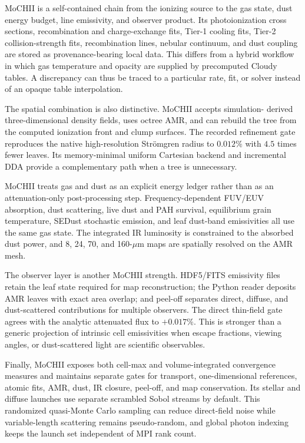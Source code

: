 \documentclass[twocolumn,linenumbers]{aastex702}
\begin{document}
MoCHII is a self-contained chain from the ionizing source to the gas state,
dust energy budget, line emissivity, and observer product.  Its
photoionization cross sections, recombination and charge-exchange fits,
Tier-1 cooling fits, Tier-2 collision-strength fits, recombination lines,
nebular continuum, and dust coupling are stored as provenance-bearing local
data.  This differs from a hybrid workflow in which gas temperature and
opacity are supplied by precomputed Cloudy tables.  A discrepancy can thus
be traced to a particular rate, fit, or solver instead of an opaque table
interpolation.

The spatial combination is also distinctive.  MoCHII accepts simulation-
derived three-dimensional density fields, uses octree AMR, and can rebuild
the tree from the computed ionization front and clump surfaces.  The recorded
refinement gate reproduces the native high-resolution Str\"omgren radius to
$0.012\%$ with $4.5$ times fewer leaves.  Its memory-minimal uniform
Cartesian backend and incremental DDA provide a complementary path when a
tree is unnecessary.

MoCHII treats gas and dust as an explicit energy ledger rather than as an
attenuation-only post-processing step.  Frequency-dependent FUV/EUV
absorption, dust scattering, live dust and PAH survival, equilibrium grain
temperature, SEDust stochastic emission, and leaf dust-band emissivities all
use the same gas state.  The integrated IR luminosity is constrained to the
absorbed dust power, and 8, 24, 70, and 160-$\mu$m maps are spatially
resolved on the AMR mesh.

The observer layer is another MoCHII strength.  HDF5/FITS emissivity files
retain the leaf state required for map reconstruction; the Python reader
deposits AMR leaves with exact area overlap; and peel-off separates direct,
diffuse, and dust-scattered contributions for multiple observers.  The direct
thin-field gate agrees with the analytic attenuated flux to $+0.017\%$.
This is stronger than a generic projection of intrinsic cell emissivities
when escape fractions, viewing angles, or dust-scattered light are scientific
observables.

Finally, MoCHII exposes both cell-max and volume-integrated convergence
measures and maintains separate gates for transport, one-dimensional
references, atomic fits, AMR, dust, IR closure, peel-off, and map
conservation.  Its stellar and diffuse launches use separate scrambled Sobol streams
by default. This randomized quasi-Monte Carlo sampling can
reduce direct-field noise while variable-length scattering remains
pseudo-random, and global photon indexing keeps the launch set independent
of MPI rank count.
\end{document}

